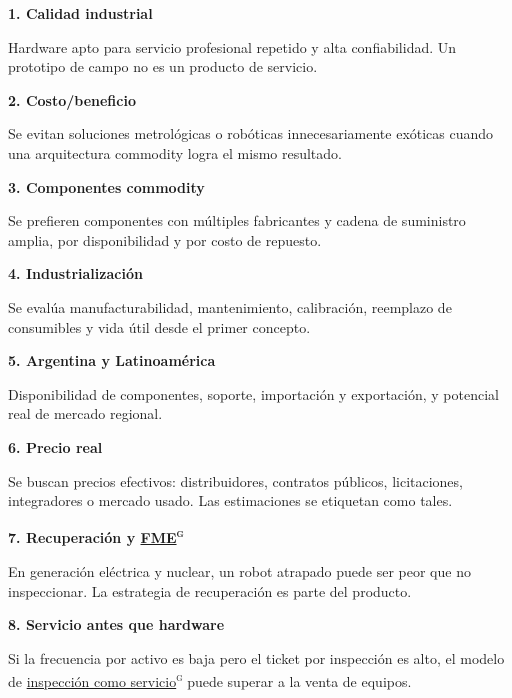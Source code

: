 \documentclass[11pt,a4paper]{article}
\newenvironment{tarjeta}[2]
  {\begin{tarjetabase}%
   {\sffamily\bfseries\color{navy}#1}%
   \ifstrempty{#2}{}{\\[1pt]{\sffamily\scriptsize\color{gray2}#2}}%
   \par\vspace{3pt}}
  {\end{tarjetabase}}
\begin{document}
\begin{tarjeta}{1. Calidad industrial}{}
Hardware apto para servicio profesional repetido y alta confiabilidad. Un prototipo de campo no es un producto de servicio.

\end{tarjeta}
\begin{tarjeta}{2. Costo/beneficio}{}
Se evitan soluciones metrológicas o robóticas innecesariamente exóticas cuando una arquitectura commodity logra el mismo resultado.

\end{tarjeta}
\begin{tarjeta}{3. Componentes commodity}{}
Se prefieren componentes con múltiples fabricantes y cadena de suministro amplia, por disponibilidad y por costo de repuesto.

\end{tarjeta}
\begin{tarjeta}{4. Industrialización}{}
Se evalúa manufacturabilidad, mantenimiento, calibración, reemplazo de consumibles y vida útil desde el primer concepto.

\end{tarjeta}
\begin{tarjeta}{5. Argentina y Latinoamérica}{}
Disponibilidad de componentes, soporte, importación y exportación, y potencial real de mercado regional.

\end{tarjeta}
\begin{tarjeta}{6. Precio real}{}
Se buscan precios efectivos: distribuidores, contratos públicos, licitaciones, integradores o mercado usado. Las estimaciones se etiquetan como tales.

\end{tarjeta}
\begin{tarjeta}{7. Recuperación y \hyperlink{g-fme}{FME}\textsuperscript{\textsc{g}}}{}
En generación eléctrica y nuclear, un robot atrapado puede ser peor que no inspeccionar. La estrategia de recuperación es parte del producto.

\end{tarjeta}
\begin{tarjeta}{8. Servicio antes que hardware}{}
Si la frecuencia por activo es baja pero el ticket por inspección es alto, el modelo de \hyperlink{g-raas}{inspección como servicio}\textsuperscript{\textsc{g}} puede superar a la venta de equipos.

\end{tarjeta}
\end{document}
